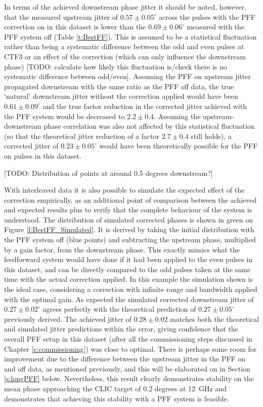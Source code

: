 In terms of the achieved downstream phase jitter it should be noted, however, that the measured upstream jitter of \(0.57\pm0.05^\circ\) across the pulses with the PFF correction on in this dataset is lower than the \(0.69\pm0.06^\circ\) measured with the PFF system off (Table \ref{t:BestFF}). This is assumed to be a statistical fluctuation rather than being a systematic difference between the odd and even pulses at CTF3 or an effect of the correction (which can only influence the downstream phase) [TODO: calculate how likely this fluctuation is/check there is no systematic difference between odd/even]. Assuming the PFF on upstream jitter propagated downstream with the same ratio as the PFF off data, the true `natural' downstream jitter without the correction applied would have been \(0.61\pm0.09^\circ\) and the true factor reduction in the corrected jitter achieved with the PFF system would be decreased to \(2.2\pm0.4\). Assuming the upstream-downstream phase correlation was also not affected by this statistical fluctuation (so that the theoretical jitter reduction of a factor \(2.7\pm0.4\) still holds), a corrected jitter of \(0.23\pm0.05^\circ\) would have been theoretically possible for the PFF on pulses in this dataset. 

[TODO: Distribution of points at around 0.5 degrees downstream?]


With interleaved data it is also possible to simulate the expected effect of the correction empirically, as an additional point of comparison between the achieved and expected results plus to verify that the complete behaviour of the system is understood. The distribution of simulated corrected phases is shown in green on Figure \ref{f:BestFF_Simulated}. It is derived by taking the initial distribution with the PFF system off (blue points) and subtracting the upstream phase, multiplied by a gain factor, from the downstream phase. This exactly mimics what the feedforward system would have done if it had been applied to the even pulses in this dataset, and can be directly compared to the odd pulses taken at the same time with the actual correction applied. In this example the simulation shown is the ideal case, considering a correction with infinite range and bandwidth applied with the optimal gain. As expected the simulated corrected downstream jitter of \(0.27\pm0.02^\circ\) agrees perfectly with the theoretical prediction of \(0.27\pm0.05^\circ\) previously derived. The achieved jitter of \(0.28\pm0.02\) matches both the theoretical and simulated jitter predictions within the error, giving confidence that the overall PFF setup in this dataset (after all the commissioning steps discussed in Chapter \ref{c:commissioning}) was close to optimal. There is perhaps some room for improvement due to the difference between the upstream jitter in the PFF on and off data, as mentioned previously, and this will be elaborated on in Section \ref{s:longPFF} below. Nevertheless, this result clearly demonstrates stability on the mean phase approaching the CLIC target of 0.2 degrees at 12~GHz and demonstrates that achieving this stability with a PFF system is feasible.


